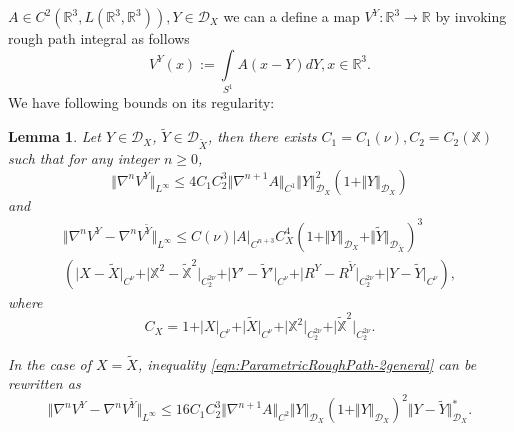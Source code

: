 \documentclass[11pt,a4paper,leqno]{amsart}%
\theoremstyle{plain}
\theoremstyle{remark}
\theoremstyle{plain}
\newtheorem{lemma}[theorem]{Lemma}
\numberwithin{equation}{section}
\def\Rnu{{\mathbb R}}
\def\intl{\int\limits}
\begin{document}
$A\in C^2(\Rnu^3,L(\Rnu^3,\Rnu^3)),Y\in\mathcal{D}_X$ we can a
define a map  $V^Y:\Rnu^3\to\Rnu$  by invoking rough path integral as follows
\begin{equation}
V^Y(x):=\intl_{S^1}A(x-Y)dY,x\in\Rnu^3.
\end{equation}
We have following bounds on its regularity:
\begin{lemma}\label{lem:ParametricRoughPath}
Let $Y\in \mathcal{D}_X$, $\tilde{Y}\in \mathcal{D}_{\tilde{X}}$,
then there exists $C_1=C_1(\nu),C_2=C_2(\mathbb{X})$ such that for
any integer $n\geq 0$,
\begin{equation}
\Vert \nabla^nV^Y\Vert_{L^{\infty}}\leq
4C_1C_2^3\Vert \nabla^{n+1}A\Vert_{C^1}\Vert Y\Vert_{\mathcal{D}_X}^2(1+\Vert Y\Vert_{\mathcal{D}_X})\label{eqn:ParametricRoughPath-1}
\end{equation}
and
\begin{multline}\label{eqn:ParametricRoughPath-2general}
\Vert \nabla^nV^Y-\nabla^nV^{\tilde{Y}}\Vert_{L^{\infty}}\leq
C(\nu)\vert A\vert_{C^{n+3}}C_X^4(1+\Vert Y\Vert_{\mathcal{D}_X}+\Vert \tilde{Y}\Vert_{\mathcal{D}_{\tilde{X}}})^3\\
(\vert X-\tilde{X}\vert_{C^{\nu}}+\vert \mathbb{X}^2-\mathbb{\tilde{X}}^2\vert_{C_2^{2\nu}}+\vert Y'-\tilde{Y}'\vert_{C^{\nu}}+\vert R^Y-R^{\tilde{Y}}\vert_{C_2^{2\nu}}+\vert Y-\tilde{Y}\vert_{C^{\nu}}),
\end{multline}
where
$$
C_X=1+\vert X\vert_{C^{\nu}}+\vert \tilde{X}\vert_{C^{\nu}}+\vert \mathbb{X}^2\vert_{C_2^{2\nu}}+\vert \mathbb{\tilde{X}}^2\vert_{C_2^{2\nu}}.
$$

In the case of $X=\tilde{X}$, inequality \eqref{eqn:ParametricRoughPath-2general} can be rewritten as
\begin{equation}
\Vert \nabla^nV^Y-\nabla^nV^{\tilde{Y}}\Vert_{L^{\infty}}\leq
16C_1C_2^3\Vert \nabla^{n+1}A\Vert_{C^2}\Vert Y\Vert_{\mathcal{D}_X}(1+\Vert Y\Vert_{\mathcal{D}_X})^2\Vert Y-\tilde{Y}\Vert_{\mathcal{D}_X}^*.
\label{eqn:ParametricRoughPath-2}
\end{equation}
\end{lemma}
\end{document}

